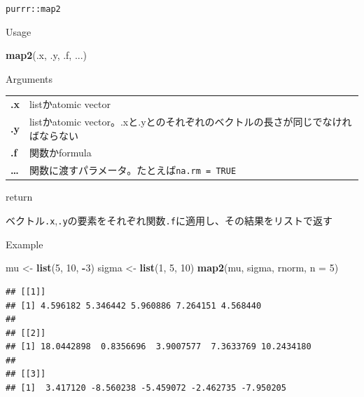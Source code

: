 \documentclass[ignorenonframetext,]{beamer}
\newenvironment{Shaded}{\begin{snugshade}}{\end{snugshade}}
\newcommand{\KeywordTok}[1]{\textcolor[rgb]{0.13,0.29,0.53}{\textbf{#1}}}
\newcommand{\DataTypeTok}[1]{\textcolor[rgb]{0.13,0.29,0.53}{#1}}
\newcommand{\DecValTok}[1]{\textcolor[rgb]{0.00,0.00,0.81}{#1}}
\newcommand{\StringTok}[1]{\textcolor[rgb]{0.31,0.60,0.02}{#1}}
\newcommand{\OperatorTok}[1]{\textcolor[rgb]{0.81,0.36,0.00}{\textbf{#1}}}
\newcommand{\NormalTok}[1]{#1}
\begin{document}
\begin{frame}[fragile]{\texttt{purrr::map2}}

\begin{block}{Usage}

\begin{Shaded}
\begin{Highlighting}[]
\KeywordTok{map2}\NormalTok{(.x, .y, .f, ...)}
\end{Highlighting}
\end{Shaded}

\end{block}

\begin{block}{Arguments}

\begin{longtable}[]{@{}ll@{}}
\toprule
\textbf{.x} & listかatomic vector\tabularnewline
\textbf{.y} & listかatomic
vector。.xと.yとのそれぞれのベクトルの長さが同じでなければならない\tabularnewline
\textbf{.f} & 関数かformula\tabularnewline
\textbf{\ldots{}} &
関数に渡すパラメータ。たとえば\texttt{na.rm\ =\ TRUE}\tabularnewline
\bottomrule
\end{longtable}

\end{block}

\begin{block}{return}

ベクトル\texttt{.x},\texttt{.y}の要素をそれぞれ関数\texttt{.f}に適用し、その結果をリストで返す

\end{block}

\end{frame}

\begin{frame}[fragile]{Example}

\begin{Shaded}
\begin{Highlighting}[]
\NormalTok{mu <-}\StringTok{ }\KeywordTok{list}\NormalTok{(}\DecValTok{5}\NormalTok{, }\DecValTok{10}\NormalTok{, }\OperatorTok{-}\DecValTok{3}\NormalTok{)}
\NormalTok{sigma <-}\StringTok{ }\KeywordTok{list}\NormalTok{(}\DecValTok{1}\NormalTok{, }\DecValTok{5}\NormalTok{, }\DecValTok{10}\NormalTok{)}
\KeywordTok{map2}\NormalTok{(mu, sigma, rnorm, }\DataTypeTok{n =} \DecValTok{5}\NormalTok{)}
\end{Highlighting}
\end{Shaded}

\begin{verbatim}
## [[1]]
## [1] 4.596182 5.346442 5.960886 7.264151 4.568440
## 
## [[2]]
## [1] 18.0442898  0.8356696  3.9007577  7.3633769 10.2434180
## 
## [[3]]
## [1]  3.417120 -8.560238 -5.459072 -2.462735 -7.950205
\end{verbatim}

\end{frame}
\end{document}

